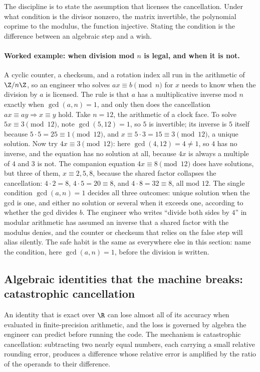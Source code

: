 The discipline is to state the assumption that licenses the
cancellation. Under what condition is the divisor nonzero, the matrix
invertible, the polynomial coprime to the modulus, the function
injective. Stating the condition is the difference between an
algebraic step and a wish.

\paragraph{Worked example: when division mod $n$ is legal, and when it is
not.} A cyclic counter, a checksum, and a rotation index all run in the
arithmetic of $\Z/n\Z$, so an engineer who solves $a x \equiv b \pmod n$
for $x$ needs to know when the division by $a$ is licensed. The rule is
that $a$ has a multiplicative inverse mod $n$ exactly when $\gcd(a, n) =
1$, and only then does the cancellation $a x \equiv a y \Rightarrow x
\equiv y$ hold. Take $n = 12$, the arithmetic of a clock face. To solve
$5 x \equiv 3 \pmod{12}$, note $\gcd(5, 12) = 1$, so $5$ is invertible;
its inverse is $5$ itself because $5 \cdot 5 = 25 \equiv 1 \pmod{12}$, and
$x \equiv 5 \cdot 3 = 15 \equiv 3 \pmod{12}$, a unique solution. Now try
$4 x \equiv 3 \pmod{12}$: here $\gcd(4, 12) = 4 \neq 1$, so $4$ has no
inverse, and the equation has no solution at all, because $4 x$ is always
a multiple of $4$ and $3$ is not. The companion equation $4 x \equiv 8
\pmod{12}$ does have solutions, but three of them, $x \equiv 2, 5, 8$,
because the shared factor collapses the cancellation: $4 \cdot 2 = 8$,
$4 \cdot 5 = 20 \equiv 8$, and $4 \cdot 8 = 32 \equiv 8$, all mod $12$.
The single condition $\gcd(a, n) = 1$ decides all three outcomes: unique
solution when the gcd is one, and either no solution or several when it
exceeds one, according to whether the gcd divides $b$. The engineer who
writes ``divide both sides by $4$'' in modular arithmetic has assumed an
inverse that a shared factor with the modulus denies, and the counter or
checksum that relies on the false step will alias silently. The safe
habit is the same as everywhere else in this section: name the condition,
here $\gcd(a, n) = 1$, before the division is written.

\subsection{Algebraic identities that the machine breaks: catastrophic
cancellation}

An identity that is exact over $\R$ can lose almost all of its accuracy
when evaluated in finite-precision arithmetic, and the loss is governed
by algebra the engineer can predict before running the code. The
mechanism is catastrophic cancellation: subtracting two nearly equal
numbers, each carrying a small relative rounding error, produces a
difference whose relative error is amplified by the ratio of the
operands to their difference.

